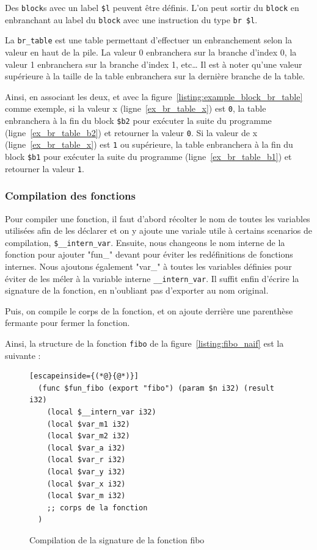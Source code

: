 \documentclass{rapportECL}
\begin{document}
Des \verb|block|s avec un label \verb|$l| peuvent être définis. L'on peut sortir du \verb|block| en enbranchant au label du 
\verb|block| avec une instruction du type \verb|br $l|.

La \verb|br_table| est une table permettant d'effectuer un enbranchement selon la valeur en haut de la pile.
La valeur 0 enbranchera sur la branche d'index 0, la valeur 1 enbranchera sur la branche d'index 1, etc\dots
Il est à noter qu'une valeur supérieure à la taille de la table enbranchera sur la dernière branche de la table.

Ainsi, en associant les deux, et avec la figure~\ref{listing:example_block_br_table} comme exemple, si la valeur x (ligne~\ref{ex_br_table_x})
est \verb|0|, la table enbranchera à la fin du block \verb|$b2| pour exécuter la suite du programme (ligne~\ref{ex_br_table_b2}) et 
retourner la valeur \verb|0|. Si la valeur de x (ligne~\ref{ex_br_table_x}) est \verb|1| ou supérieure, la table enbranchera à la fin du 
block \verb|$b1| pour exécuter la suite du programme (ligne~\ref{ex_br_table_b1}) et retourner la valeur \verb|1|.

\subsubsection{Compilation des fonctions}

Pour compiler une fonction, il faut d'abord récolter le nom de toutes les variables utilisées afin de les 
déclarer et on y ajoute une variale utile à certains scenarios de compilation, \verb|$__intern_var|.
Ensuite, nous changeons le nom interne de la fonction pour ajouter "fun\_" devant pour éviter les 
redéfinitions de fonctions internes.
Nous ajoutons également "var\_" à toutes les variables définies pour éviter de les méler à la variable interne \verb|__intern_var|.
Il suffit enfin d'écrire la signature de la fonction, en n'oubliant pas d'exporter au nom original.

Puis, on compile le corps de la fonction, et on ajoute derrière une parenthèse fermante pour fermer la fonction.

Ainsi, la structure de la fonction \verb|fibo| de la figure~\ref*{listing:fibo_naif} est la suivante :
\begin{figure}[H]
	\begin{lstlisting}[escapeinside={(*@}{@*)}]
  (func $fun_fibo (export "fibo") (param $n i32) (result i32)
    (local $__intern_var i32)
    (local $var_m1 i32)
    (local $var_m2 i32)
    (local $var_a i32)
    (local $var_r i32)
    (local $var_y i32)
    (local $var_x i32)
    (local $var_m i32)
    ;; corps de la fonction
  )
	\end{lstlisting}
	\caption{Compilation de la signature de la fonction fibo}
	\label{listing:signature_fibo}
\end{figure}
\end{document}
